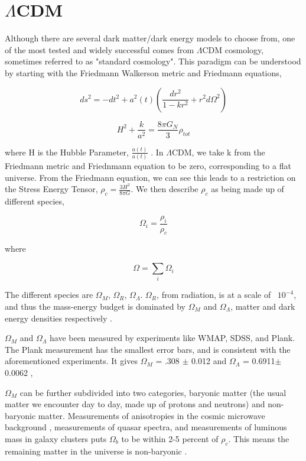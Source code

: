 \documentclass[12pt]{article}
\begin{document}
\section{$\Lambda$CDM}

Although there are several dark matter/dark energy models to choose from, one of the most tested and widely successful comes from $\Lambda$CDM cosmology, sometimes referred to as "standard cosmology". This paradigm can be understood by starting with the Friedmann Walkerson metric and Friedmann equations,

$$ds^{2} = -dt^{2} + a^{2}(t) (\frac{dr^{2}}{1 - kr^{2}} + r^{2}d\Omega^{2})$$

$$ H^{2} + \frac{k}{a^2} = \frac{8\pi G_{N}}{3} \rho_{tot}$$

where H is the Hubble Parameter, $\frac{\dot{a}(t)}{a(t)}$ \cite{Bertone2004}. In $\Lambda$CDM, we take k from the Friedmann metric and Friednmann equation to be zero, corresponding to a flat universe. From the Friedmann equation, we can see this leads to a restriction on the Stress Energy Tensor, $\rho_{c} = \frac{3H^2}{8\pi G}$. We then describe $\rho_{c}$ as being made up of different species,


$$\Omega_{i} = \frac{\rho_{i}}{\rho_{c}}$$

where 

$$\Omega = \sum_{i} \Omega_{i}$$

The different species are $\Omega_{M}$, $\Omega_{R}$, $\Omega_{\Lambda}$. $\Omega_{R}$, from radiation, is at a scale of ~$10^{-4}$, and thus the mass-energy budget is dominated by $\Omega_{M}$ and $\Omega_{\Lambda}$, matter and dark energy densities respectively \cite{Caroll2004}.

$\Omega_{M}$ and $\Omega_{\Lambda}$ have been measured by experiments like WMAP, SDSS, and Plank. The Plank measurement has the smallest error bars, and is consistent with the aforementioned experiments. It gives $\Omega_{M}$ = .308 $\pm$ 0.012  and $\Omega_{\Lambda}$  = 0.6911$\pm$ 0.0062 \cite{Plank2015}, \cite{SDSS2003}

$\Omega_{M}$ can be further subdivided into two categories, baryonic matter (the usual matter we encounter day to day, made up of protons and neutrons) and non-baryonic matter. Measurements of anisotropies in the cosmic microwave background , measurements of quasar spectra, and measurements of luminous mass in galaxy clusters puts $\Omega_{b}$ to be within 2-5 percent of $\rho_{c}$. This means the remaining matter in the universe is non-baryonic \cite{scott2002}.
\end{document}
